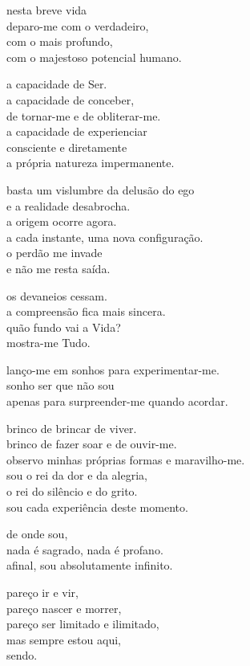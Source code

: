 nesta breve vida\\
deparo-me com o verdadeiro,\\
com o mais profundo,\\
com o majestoso potencial humano.

a capacidade de Ser.\\
a capacidade de conceber,\\
de tornar-me e de obliterar-me.\\
a capacidade de experienciar\\
consciente e diretamente\\
a própria natureza impermanente.

basta um vislumbre da delusão do ego\\
e a realidade desabrocha.\\
a origem ocorre agora.\\
a cada instante, uma nova configuração.\\
o perdão me invade\\
e não me resta saída.

os devaneios cessam.\\
a compreensão fica mais sincera.\\
quão fundo vai a Vida?\\
mostra-me Tudo.

lanço-me em sonhos para experimentar-me.\\
sonho ser que não sou\\
apenas para surpreender-me quando acordar.

brinco de brincar de viver.\\
brinco de fazer soar e de ouvir-me.\\
observo minhas próprias formas e maravilho-me.\\
sou o rei da dor e da alegria,\\
o rei do silêncio e do grito.\\
sou cada experiência deste momento.

de onde sou,\\
nada é sagrado, nada é profano.\\
afinal, sou absolutamente infinito.

pareço ir e vir,\\
pareço nascer e morrer,\\
pareço ser limitado e ilimitado,\\
mas sempre estou aqui,\\
sendo.
